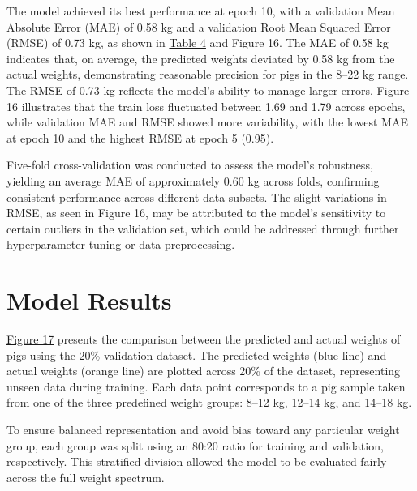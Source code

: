 The model achieved its best performance at epoch 10, with a validation Mean Absolute Error (MAE) of 0.58 kg and a validation Root Mean Squared Error (RMSE) of 0.73 kg, as shown in \hyperref[tab:Performance Metrics of the Hybrid LightGBM-CNN Model Across Epochs]{Table 4} and Figure 16. The MAE of 0.58 kg indicates that, on average, the predicted weights deviated by 0.58 kg from the actual weights, demonstrating reasonable precision for pigs in the 8–22 kg range. The RMSE of 0.73 kg reflects the model’s ability to manage larger errors. Figure 16 illustrates that the train loss fluctuated between 1.69 and 1.79 across epochs, while validation MAE and RMSE showed more variability, with the lowest MAE at epoch 10 and the highest RMSE at epoch 5 (0.95).

Five-fold cross-validation was conducted to assess the model’s robustness, yielding an average MAE of approximately 0.60 kg across folds, confirming consistent performance across different data subsets. The slight variations in RMSE, as seen in Figure 16, may be attributed to the model’s sensitivity to certain outliers in the validation set, which could be addressed through further hyperparameter tuning or data preprocessing.

\section{Model Results}

\hyperref[fig:Predicted vs Actual Weights]{Figure 17} presents the comparison between the predicted and actual weights of pigs using the 20\% validation dataset. The predicted weights (blue line) and actual weights (orange line) are plotted across 20\% of the dataset, representing unseen data during training. Each data point corresponds to a pig sample taken from one of the three predefined weight groups: 8–12 kg, 12–14 kg, and 14–18 kg.

To ensure balanced representation and avoid bias toward any particular weight group, each group was split using an 80:20 ratio for training and validation, respectively. This stratified division allowed the model to be evaluated fairly across the full weight spectrum.

\newpage

